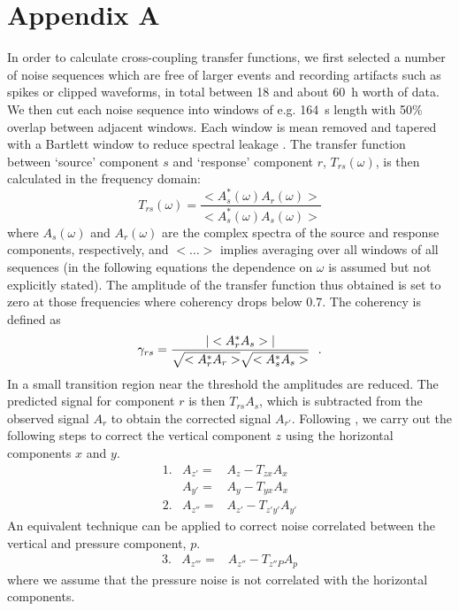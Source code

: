 \documentclass{article}
\begin{document}
{\section*{Appendix A}
In order to calculate cross-coupling transfer functions, 
we first selected a number of noise sequences which are free of
larger events and recording artifacts such as spikes or clipped
waveforms, in total between 18 and about 60~h worth of data. We then cut each
noise sequence into windows of e.g. 164~s length with 50\% overlap between
adjacent windows.  Each window is mean removed and 
tapered with a Bartlett window to reduce spectral leakage \citep{press:92}.
The transfer function between `source' component $s$ and `response'
component $r$, $T_{rs}(\omega)$, is then calculated in the frequency domain:
\begin{displaymath}
T_{rs}(\omega)=\frac{<A_s^*(\omega)A_r(\omega)>}{<A_s^*(\omega)A_s(\omega)>}
\end{displaymath}
where $A_s(\omega)$ and $A_r(\omega)$ are the complex spectra of the
source and response components, respectively, and $<\ldots>$
implies averaging over all windows of all sequences (in the following
equations the dependence on $\omega$ is assumed but not explicitly stated).
The amplitude of the transfer function thus obtained is set to zero at
those frequencies where coherency drops below 0.7. The coherency is defined as
\begin{displaymath}
\gamma_{rs}=\frac{|<A_r^*A_s>|}{\sqrt{<A_r^*A_r>}\sqrt{<A_s^*A_s>}}\ \ 
{\bf .}
\end{displaymath}
In a small transition region near the threshold the amplitudes are reduced.  
The predicted signal for component $r$ is then $T_{rs} A_s$, 
which is subtracted from the observed signal $A_r$ to obtain the corrected 
signal $A_{r'}$.  
Following \citet{crawford:00}, we carry out the following steps to correct 
the vertical component $z$ using the horizontal components $x$ and $y$.
\begin{eqnarray*}
1. & A_{z'}= & A_z-T_{zx}A_x \\
   & A_{y'}= & A_y-T_{yx}A_x \\
2. & A_{z''}= & A_{z'}-T_{z'y'}A_{y'}
\end{eqnarray*}
An equivalent technique can be applied to correct noise correlated
between the vertical and pressure component, $p$.
\begin{eqnarray*}
3. & A_{z'''}= & A_{z''}-T_{z''P}A_p
\end{eqnarray*}
where we assume that the pressure noise is not correlated with the
horizontal components. 

}
\end{document}
